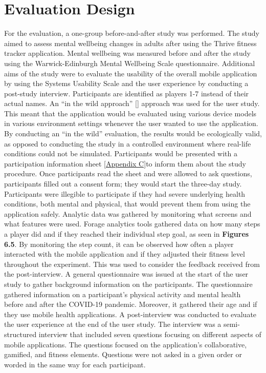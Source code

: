 \documentclass{l4proj}
\begin{document}
\section{Evaluation Design} 
For the evaluation, a one-group before-and-after study was performed. The study aimed to assess mental wellbeing changes in adults after using the Thrive fitness tracker application. Mental wellbeing was measured before and after the study using the Warwick-Edinburgh Mental Wellbeing Scale questionnaire. Additional aims of the study were to evaluate the usability of the overall mobile application by using the Systems Usability Scale and the user experience by conducting a post-study interview. Participants are identified as players 1-7 instead of their actual names. 
An “in the wild approach” [] approach was used for the user study. This meant that the application would be evaluated using various device models in various environment settings whenever the user wanted to use the application. By conducting an “in the wild” evaluation, the results would be ecologically valid, as opposed to conducting the study in a controlled environment where real-life conditions could not be simulated. 
Participants would be presented with a participation information sheet \ref{Appendix C}to inform them about the study procedure. Once participants read the sheet and were allowed to ask questions, participants filled out a consent form; they would start the three-day study. Participants were illegible to participate if they had severe underlying health conditions, both mental and physical, that would prevent them from using the application safely. 
Analytic data was gathered by monitoring what screens and what features were used. Forage analytics tools gathered data on how many steps a player did and if they reached their individual step goal, as seen in \textbf{Figures 6.5}. By monitoring the step count, it can be observed how often a player interacted with the mobile application and if they adjusted their fitness level throughout the experiment. This was used to consider the feedback received from the post-interview. 
A general questionnaire was issued at the start of the user study to gather background information on the participants. The questionnaire gathered information on a participant’s physical activity and mental health before and after the COVID-19 pandemic. Moreover, it gathered their age and if they use mobile health applications. 
A post-interview was conducted to evaluate the user experience at the end of the user study. The interview was a semi-structured interview that included seven questions focusing on different aspects of mobile applications. The questions focused on the application's collaborative, gamified, and fitness elements. Questions were not asked in a given order or worded in the same way for each participant.   
\end{document}
